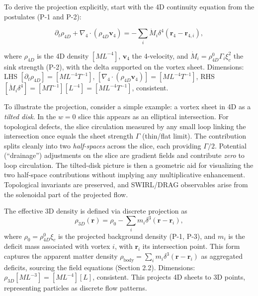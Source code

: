 To derive the projection explicitly, start with the 4D continuity equation from the postulates (P-1 and P-2):

\begin{equation}
\partial_t \rho_{4D} + \nabla_4 \cdot (\rho_{4D} \mathbf{v}_4) = -\sum_i \dot{M}_i \delta^4(\mathbf{r}_4 - \mathbf{r}_{4,i}),
\end{equation}

where $\rho_{4D}$ is the 4D density $[M L^{-4}]$, $\mathbf{v}_4$ the 4-velocity, and $\dot{M}_i = \rho_{4D}^0 \Gamma_i \xi_c^2$ the sink strength (P-2), with the delta supported on the vortex sheet. Dimensions: LHS $[\partial_t \rho_{4D}] = [M L^{-4} T^{-1}]$, $[\nabla_4 \cdot (\rho_{4D} \mathbf{v}_4)] = [M L^{-4} T^{-1}]$, RHS $[\dot{M}_i \delta^4] = [M T^{-1}] [L^{-4}] = [M L^{-4} T^{-1}]$, consistent.

To illustrate the projection, consider a simple example: a vortex sheet in 4D as a \emph{tilted disk}. In the $w=0$ slice this appears as an elliptical intersection. For topological defects, the slice circulation measured by any small loop linking the intersection once equals the sheet strength $\Gamma$ (thin/flat limit). The contribution splits cleanly into two \emph{half-spaces} across the slice, each providing $\Gamma/2$. Potential (“drainage”) adjustments on the slice are gradient fields and contribute \emph{zero} to loop circulation. The tilted-disk picture is then a geometric aid for visualizing the two half-space contributions without implying any multiplicative enhancement. Topological invariants are preserved, and SWIRL/DRAG observables arise from the solenoidal part of the projected flow.

The effective 3D density is defined via discrete projection as
\begin{equation}
\rho_{3D}(\mathbf{r}) = \rho_0 - \sum_i m_i \delta^3(\mathbf{r} - \mathbf{r}_i),
\end{equation}
where $\rho_0 = \rho_{4D}^0 \xi_c$ is the projected background density (P-1, P-3), and $m_i$ is the deficit mass associated with vortex $i$, with $\mathbf{r}_i$ its intersection point. This form captures the apparent matter density $\rho_{\text{body}} = \sum_i m_i \delta^3(\mathbf{r} - \mathbf{r}_i)$ as aggregated deficits, sourcing the field equations (Section 2.2). Dimensions: $\rho_{3D} [M L^{-3}] = [M L^{-4}] [L]$, consistent. This projects 4D sheets to 3D points, representing particles as discrete flow patterns.

